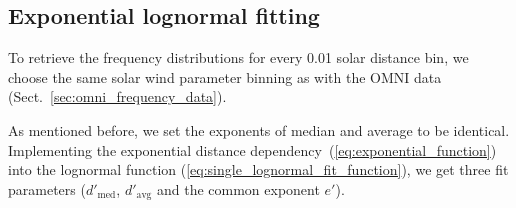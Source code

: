 \subsection{Exponential lognormal fitting}
To retrieve the frequency distributions for every \SI{0.01}{\au} solar distance bin, we choose the same solar wind parameter binning as with the OMNI data (Sect.~\ref{sec:omni_frequency_data}).

As mentioned before, we set the exponents of median and average to be identical. Implementing the exponential distance dependency~(\ref{eq:exponential_function}) into the lognormal function (\ref{eq:single_lognormal_fit_function}), we get three fit parameters ($d'_\text{med}$, $d'_\text{avg}$ and the common exponent $e'$).

